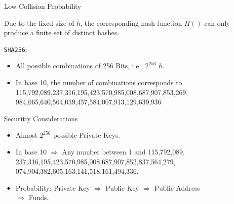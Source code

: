 \documentclass[]{beamer}
\begin{document}
\begin{frame}{Low Collision Probability}

Due to the fixed size of $h$, the corresponding hash function $H()$ can only produce a finite set of distinct hashes.
\vspace{1em}

\texttt{SHA256}:
	\begin{itemize}
		\item All possible combinations of 256 Bits, i.e., $2^{256}$ $h$.
		\item In base 10, the number of combinations corresponds to 115,792,089,237,316,195,423,570,985,008,687,907,853,269,\\984,665,640,564,039,457,584,007,913,129,639,936
	\end{itemize}
\vspace{1em}

	
\end{frame}


\begin{frame}{Securitiy Considerations}

\begin{itemize}
		\item<1-> Almost $2^{256}$ possible Private Keys.
		\item<3-> In base 10 $\Rightarrow$ Any number between 1 and 115,792,089,\\
		237,316,195,423,570,985,008,687,907,852,837,564,279, \\
		074,904,382,605,163,141,518,161,494,336.
		\item<4-> Probability: Private Key $\Rightarrow$ Public Key $\Rightarrow$ Public Address \\ $\Rightarrow$ Funds. 
	\end{itemize}

\end{frame}
\end{document}
